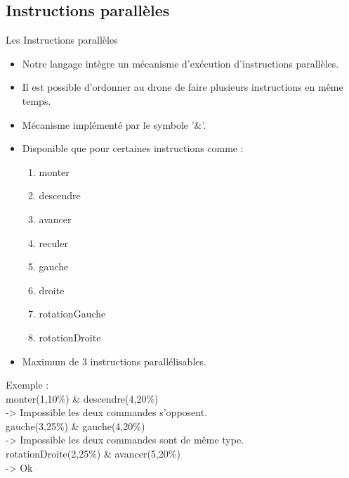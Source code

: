 \documentclass{bredelebeamer}
\begin{document}
	\subsection{Instructions parallèles} 
\begin{frame}{Les Instructions parallèles} 
\begin{itemize}
\item Notre langage intègre un mécanisme d'exécution d'instructions parallèles.
\item Il est possible d'ordonner au drone de faire plusieurs instructions en même temps. 
\item Mécanisme implémenté par le symbole '\&'. \pause
\item Disponible que pour certaines instructions comme :  
	\begin{enumerate}
		\item monter
		\item descendre
		\item avancer
		\item reculer
		\item gauche
		\item droite
		\item rotationGauche
		\item rotationDroite
	\end{enumerate}	\pause
\item Maximum de 3 instructions parallélisables.
\end{itemize}
\begin{tabbing}
Exemple : \=\\
	\>\color{Framarouge}monter(\color{black}1\color{Framarouge},\color{Framagris}10\%\color{Framarouge}) \& 
	\color{Framarouge}descendre(\color{black}4\color{Framarouge},\color{Framagris}20\%\color{Framarouge})\\ \pause
	\color{black}\>-> Impossible les deux commandes s'opposent.\\
	\>\color{Framarouge}gauche(\color{black}3\color{Framarouge},\color{Framagris}25\%\color{Framarouge}) \& 
	\color{Framarouge}gauche(\color{black}4\color{Framarouge},\color{Framagris}20\%\color{Framarouge})\\ \pause
	\color{black}\>-> Impossible les deux commandes sont de même type.\\
	\>\color{Framarouge}rotationDroite(\color{black}2\color{Framarouge},\color{Framagris}25\%\color{Framarouge}) \& 
	\color{Framarouge}avancer(\color{black}5\color{Framarouge},\color{Framagris}20\%\color{Framarouge})\\ \pause
	\color{black}\>-> Ok
\end{tabbing}
\end{frame}
	
\end{document}
